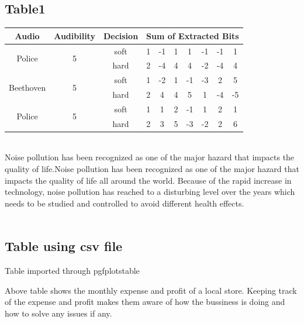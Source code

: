 \documentclass[12pt]{article}
\begin{document}
\begin{large}
\subsection{Table1}
\begin{tabular}{|c|c|c|c|c|c|c|c|c|c|}
\hline \hline
Audio & Audibility & Decision  & \multicolumn{7}{|c|}{Sum of Extracted Bits}\\
\hline
\multirow{2}{*}{Police} & \multirow{2}{*}{5} & soft & 1 & -1 & 1 & 1 & -1 & -1 & 1\\ 
&  & hard & 2 & -4 & 4 & 4 & -2 & -4 & 4\\ \hline
\multirow{2}{*}{Beethoven} & \multirow{2}{*}{5} & soft & 1 & -2 & 1 & -1 & -3 & 2 & 5\\
 &  & hard & 2 & 4 & 4 & 5 & 1 & -4 & -5\\ \hline
\multirow{2}{*}{Police} & \multirow{2}{*}{5} & soft & 1 & 1 & 2 & -1 & 1 & 2 & 1\\
 &  & hard & 2 & 3 & 5 & -3 & -2 & 2 & 6\\
\hline \hline
\end{tabular}
\vspace{1cm}
\\
Noise pollution has been recognized as one of the major hazard that impacts the quality of life.Noise pollution has been recognized as one of the major hazard that impacts the quality of life all around the world. Because of the rapid increase in technology, noise pollution has reached to a disturbing level over the years which needs to be studied and controlled to avoid different health effects.\\\\
\subsection{Table using csv file}
\begin{table}[h!]
\caption{Table imported through pgfplotstable}
\label{csvTable}
\begin{center}
\end{center}
\end{table}
\vspace{0.7cm}
Above table shows the monthly expense and profit of a local store. Keeping track of the expense and profit makes them aware of how the bussiness is doing and how to solve any issues if any.

\end{large}
\end{document}
